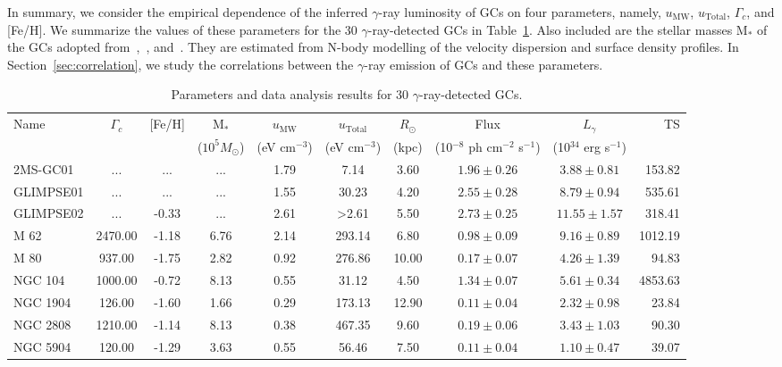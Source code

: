 \documentclass[doublespace,nopageskip]{VTthesis} %
\begin{document}
In summary, we consider the empirical dependence of the inferred $\gamma$-ray luminosity of GCs on four parameters, namely, $u_\text{MW}$, $u_\text{Total}$, $\Gamma_c$, and [Fe/H]. We summarize the values of these parameters for the 30 $\gamma$-ray-detected GCs in Table~\ref{tab:pars}. Also included are the stellar masses M$_*$ of the GCs adopted from~\citet{2017MNRAS.464.2174B},~\cite{2017MNRAS.471.3668S}, and~\citet{2018MNRAS.478.1520B}. They are estimated from N-body modelling of the velocity dispersion and surface density profiles. In Section~\ref{sec:correlation}, we study the correlations between the $\gamma$-ray emission of GCs and these parameters.

\begin{table}
\centering
\caption{Parameters and data analysis results for 30 $\gamma$-ray-detected GCs.}\label{tab:pars}
\begin{threeparttable}
\begin{tabular}{lccccccccr}
\hline
Name &  $\Gamma_c$\tnote{a} & [Fe/H]\tnote{b}  & M$_*$\tnote{c} & $u_\text{MW}$\tnote{d} & $u_\text{Total}$\tnote{e} & $R_\odot$\tnote{f} & Flux\tnote{g} & $L_\gamma$\tnote{g} & TS\tnote{h}\\
 & &  & ($10^5 M_\odot$) & (eV cm$^{-3}$) & (eV cm$^{-3}$) & (kpc) & (10$^{-8}$ ph cm$^{-2}$ s$^{-1}$)  & (10$^{34}$ erg s$^{-1}$)\\
\hline
2MS-GC01 & ... & ... & ... & 1.79 & 7.14 & 3.60 & $1.96 \pm 0.26$ & $3.88 \pm 0.81$ & 153.82\\
GLIMPSE01 & ... & ... & ... & 1.55 & 30.23 & 4.20 & $2.55 \pm 0.28$ & $8.79 \pm 0.94$ & 535.61\\
GLIMPSE02 & ... & -0.33 & ... & 2.61 & >2.61 & 5.50 & $2.73 \pm 0.25$ & $11.55 \pm 1.57$ & 318.41\\
M 62 & 2470.00 & -1.18 & 6.76 & 2.14 & 293.14 & 6.80 & $0.98 \pm 0.09$ & $9.16 \pm 0.89$ & 1012.19\\
M 80 & 937.00 & -1.75 & 2.82 & 0.92 & 276.86 & 10.00 & $0.17 \pm 0.07$ & $4.26 \pm 1.39$ & 94.83\\
NGC 104 & 1000.00 & -0.72 & 8.13 & 0.55 & 31.12 & 4.50 & $1.34 \pm 0.07$ & $5.61 \pm 0.34$ & 4853.63\\
NGC 1904 & 126.00 & -1.60 & 1.66 & 0.29 & 173.13 & 12.90 & $0.11 \pm 0.04$ & $2.32 \pm 0.98$ & 23.84\\
NGC 2808 & 1210.00 & -1.14 & 8.13 & 0.38 & 467.35 & 9.60 & $0.19 \pm 0.06$ & $3.43 \pm 1.03$ & 90.30\\
NGC 5904 & 120.00 & -1.29 & 3.63 & 0.55 & 56.46 & 7.50 & $0.11 \pm 0.04$ & $1.10 \pm 0.47$ & 39.07\\

\end{tabular}
\end{threeparttable}
\end{table}
\end{document}
